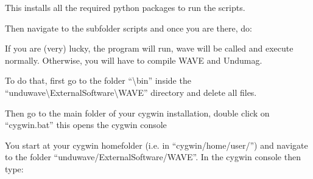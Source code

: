 \documentclass[letterpaper,10pt,english]{sphinxmanual}
\begin{document}
\begin{sphinxVerbatim}[commandchars=\\\{\}]
\end{sphinxVerbatim}

\sphinxAtStartPar
This installs all the required python packages to run the scripts.

\begin{DUlineblock}{0em}
\item[] Then navigate to the sub\sphinxhyphen{}folder scripts and once you are there, do:
\end{DUlineblock}

\begin{sphinxVerbatim}[commandchars=\\\{\}]
\end{sphinxVerbatim}

\sphinxAtStartPar
If you are (very) lucky, the program will run, wave will be called and execute normally.
Otherwise, you will have to compile WAVE and Undumag.

\begin{DUlineblock}{0em}
\item[] To do that, first go to the folder “\textbackslash{}bin” inside the “unduwave\textbackslash{}External\sphinxhyphen{}Software\textbackslash{}WAVE” directory and delete all files.
\end{DUlineblock}

\begin{DUlineblock}{0em}
\item[] Then go to the main folder of your cygwin installation, double click on “cygwin.bat” \sphinxhyphen{} this opens the cygwin console
\end{DUlineblock}

\begin{DUlineblock}{0em}
\item[] You start at your cygwin home\sphinxhyphen{}folder (i.e. in “cygwin/home/user/”) and navigate to the folder “unduwave/External\sphinxhyphen{}Software/WAVE”. In the cygwin console then type:
\end{DUlineblock}

\begin{sphinxVerbatim}[commandchars=\\\{\}]
\end{sphinxVerbatim}
\end{document}
